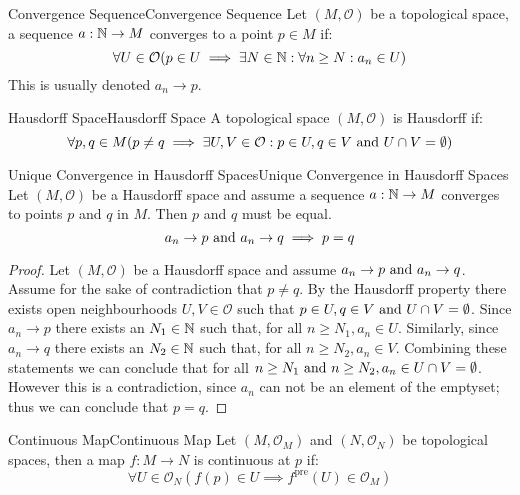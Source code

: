 \documentclass{article}
\newcommand{\tp}{\mathcal{O}}
\begin{document}
\begin{definition}{Convergence Sequence}{Convergence Sequence}
    Let $(M, \tp)$ be a topological space, a sequence $a: \mathbb{N} \to M$ converges to a point $p \in M$ if:
    $$\forall U \in \tp(p \in U \implies \exists N \in \N : \forall n \geq N : a_n \in U)$$
    This is usually denoted $a_n \to p$.
\end{definition}


\begin{definition}{Hausdorff Space}{Hausdorff Space}
    A topological space $(M, \tp)$ is Hausdorff if:
    $$\forall p, q \in M (p \neq q \implies \exists U, V \in \tp : p \in U, q \in V \tand U \cap V = \emptyset)$$
\end{definition}

\begin{proposition}{Unique Convergence in Hausdorff Spaces}{Unique Convergence in Hausdorff Spaces}
    Let $(M, \tp)$ be a Hausdorff space and assume a sequence $a: \mathbb{N} \to M$ converges to points $p$ and $q$ in $M$.
    Then $p$ and $q$ must be equal.
    $$a_n \to p \text{ and } a_n \to q \implies p = q$$
\end{proposition}

\begin{proof}
    Let $(M, \tp)$ be a Hausdorff space and assume $a_n \to p \text{ and } a_n \to q$.
    Assume for the sake of contradiction that $p \neq q$.
    By the Hausdorff property there exists open neighbourhoods $U, V \in \tp$ such that $p \in U, q \in V \text{ and } U \cap V = \emptyset$.
    Since $a_n \to p$ there exists an $N_1 \in \mathbb{N}$ such that, for all $n \geq N_1, a_n \in U$.
    Similarly, since $a_n \to q$ there exists an $N_2 \in \mathbb{N}$ such that, for all $n \geq N_2, a_n \in V$.
    Combining these statements we can conclude that for all $n \geq N_1 \text{ and } n \geq N_2, a_n \in U \cap V = \emptyset$.
    However this is a contradiction, since $a_n$ can not be an element of the emptyset; thus we can conclude that $p = q$.
\end{proof}

\begin{definition}{Continuous Map}{Continuous Map}
    Let $(M, \tp_M)$ and $(N, \tp_N)$ be topological spaces, then a map $f: M \to N$ is continuous at $p$ if:
    $$\forall U \in \tp_N \left(f(p) \in U \implies f^{\text{pre}}(U) \in \tp_M\right)$$
\end{definition}
\end{document}
